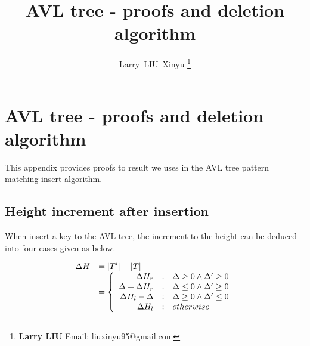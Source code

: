 \documentclass{article}
\begin{document}


\title{AVL tree - proofs and deletion algorithm}

\author{Larry~LIU~Xinyu
\thanks{{\bfseries Larry LIU} \newline
  Email: liuxinyu95@gmail.com \newline}
  }

\maketitle
\fi


\ifx\wholebook\relax
\chapter{AVL tree - proofs and deletion algorithm}
\fi


This appendix provides proofs to result we uses in the AVL tree pattern
matching insert algorithm.

\section{Height increment after insertion}

When insert a key to the AVL tree, the increment to the height can be deduced
into four cases given as below.

\[
\begin{array}{rl}
  \Delta H & = |T'| - |T| \\
              & = \left \{
                  \begin{array}{r@{\quad:\quad}l}
                  \Delta H_r & \Delta \geq 0 \land \Delta' \geq 0 \\
                  \Delta + \Delta H_r & \Delta \leq 0 \land \Delta' \geq 0 \\
                  \Delta H_l - \Delta & \Delta \geq 0 \land \Delta' \leq 0 \\
                  \Delta H_l & otherwise
                  \end{array} \right .
\end{array}
\]
\end{document}
